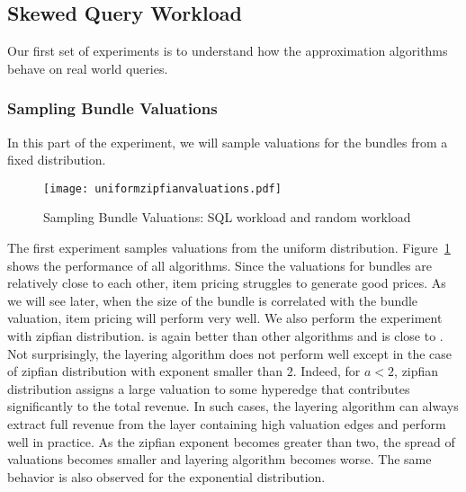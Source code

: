 \subsection{Skewed Query Workload}

Our first set of experiments is to understand how the approximation algorithms behave on real world queries. 


\subsubsection{Sampling Bundle Valuations} 
In this part of the experiment, we will sample valuations for the bundles from a fixed distribution.

\begin{figure}[!t]
	\centering
	\texttt{[image: uniformzipfianvaluations.pdf]}
	\caption{Sampling Bundle Valuations: SQL workload and random workload} \label{fig:unifzipfian}
\end{figure}  

\smallskip
{} The first experiment samples valuations from the uniform distribution. Figure~\ref{fig:unifzipfian} shows the performance of all algorithms. Since the valuations for bundles are relatively close to each other, item pricing struggles to generate good prices. As we will see later, when the size of the bundle is correlated with the bundle valuation, item pricing will perform very well.  We also perform the experiment with zipfian distribution. \lpip is again better than other algorithms and \ubp is close to \lpip. Not surprisingly, the layering algorithm does not perform well except in the case of zipfian distribution with exponent smaller than $2$. Indeed, for $a < 2$, zipfian distribution assigns a large valuation to some hyperedge that contributes significantly to the total revenue. In such cases, the layering algorithm can always extract full revenue from the layer containing high valuation edges and perform well in practice. As the zipfian exponent becomes greater than two, the spread of valuations becomes smaller and layering algorithm becomes worse. The same behavior is also observed for the exponential distribution. 

